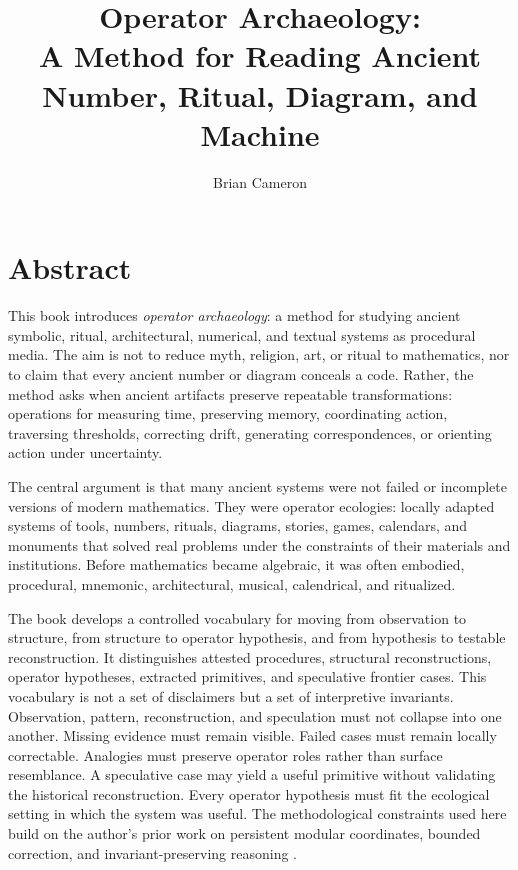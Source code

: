 \documentclass[11pt]{book}
\title{Operator Archaeology:\\
A Method for Reading Ancient Number, Ritual, Diagram, and Machine}
\author{Brian Cameron}
\date{}
\begin{document}
\frontmatter

\maketitle

\chapter*{Abstract}

This book introduces \emph{operator archaeology}: a method for studying ancient symbolic, ritual, architectural, numerical, and textual systems as procedural media. The aim is not to reduce myth, religion, art, or ritual to mathematics, nor to claim that every ancient number or diagram conceals a code. Rather, the method asks when ancient artifacts preserve repeatable transformations: operations for measuring time, preserving memory, coordinating action, traversing thresholds, correcting drift, generating correspondences, or orienting action under uncertainty.

The central argument is that many ancient systems were not failed or incomplete versions of modern mathematics. They were operator ecologies: locally adapted systems of tools, numbers, rituals, diagrams, stories, games, calendars, and monuments that solved real problems under the constraints of their materials and institutions. Before mathematics became algebraic, it was often embodied, procedural, mnemonic, architectural, musical, calendrical, and ritualized.

The book develops a controlled vocabulary for moving from observation to structure, from structure to operator hypothesis, and from hypothesis to testable reconstruction. It distinguishes attested procedures, structural reconstructions, operator hypotheses, extracted primitives, and speculative frontier cases. This vocabulary is not a set of disclaimers but a set of interpretive invariants. Observation, pattern, reconstruction, and speculation must not collapse into one another. Missing evidence must remain visible. Failed cases must remain locally correctable. Analogies must preserve operator roles rather than surface resemblance. A speculative case may yield a useful primitive without validating the historical reconstruction. Every operator hypothesis must fit the ecological setting in which the system was useful. The methodological constraints used here build on the author's prior work on persistent modular coordinates, bounded correction, and invariant-preserving reasoning \cite{Cameron2026PMC,Cameron2026IPRP}.
\end{document}
